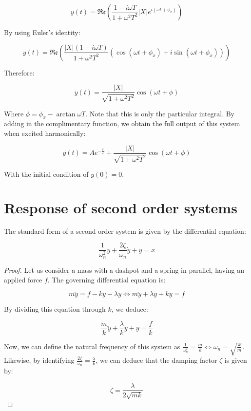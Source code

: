 \documentclass[12pt]{article}
\begin{document}
\[ y(t) = \mathfrak{Re}\left(\frac{1 - i\omega T}{1 + \omega^2T^2}|X|e^{i(\omega t + \phi_x)}\right) \]

By using Euler's identity:

\[ y(t) = \mathfrak{Re}\left(\frac{|X|(1 - i\omega T)}{1 + \omega^2T^2}(\cos{(\omega t + \phi_x)} + i\sin{(\omega t + \phi_x)})\right) \]

Therefore:

\[ y(t) = \frac{|X|}{\sqrt{1 + \omega^2T^2}}\cos{(\omega t + \phi)} \]

Where $\phi = \phi_x - \arctan{\omega T}$. Note that this is only the particular integral. By adding in the complimentary function, we obtain the full output of this system when excited harmonically:

\[ y(t) = Ae^{-\frac{t}{T}} + \frac{|X|}{\sqrt{1 + \omega^2T^2}}\cos{(\omega t + \phi)} \] 

With the initial condition of $y(0) = 0$.

\newpage

\section{Response of second order systems}

\begin{proposition}
  The standard form of a second order system is given by the differential equation:

  \[ \frac{1}{\omega_n^2}\ddot{y} + \frac{2\zeta}{\omega_n}\dot{y} + y = x \]
\end{proposition}

\begin{proof}
  Let us consider a mass with a dashpot and a spring in parallel, having an applied force $f$. The governing differential equation is:

  \[ m\ddot{y} = f - ky - \lambda\dot{y} \iff m\ddot{y} + \lambda\dot{y} + ky = f \]

  By dividing this equation through $k$, we deduce:

  \[ \frac{m}{k}\ddot{y} + \frac{\lambda}{k}\dot{y} + y = \frac{f}{k} \]

  Now, we can define the natural frequency of this system as $\frac{1}{\omega_n^2} = \frac{m}{k} \iff \omega_n = \sqrt{\frac{k}{m}}$. Likewise, by identifying $\frac{2\zeta}{\omega_n} = \frac{\lambda}{k}$, we can deduce that the damping factor $\zeta$ is given by:

  \[ \zeta = \frac{\lambda}{2\sqrt{mk}} \]
\end{proof}
\end{document}
